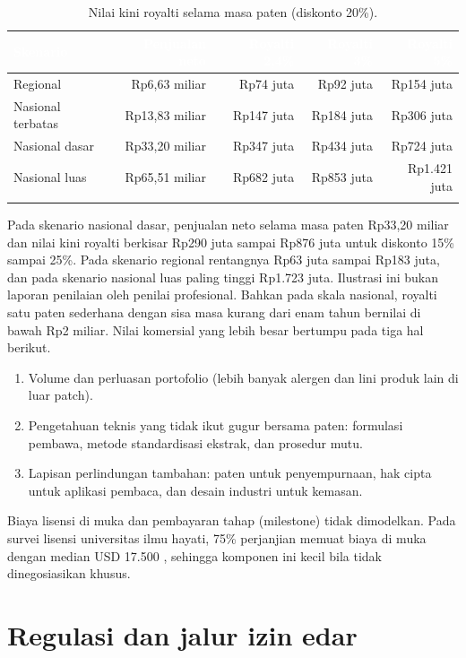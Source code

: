 \documentclass[11pt,a4paper]{article}
\newcommand{\tH}[1]{\textcolor{white}{\sffamily\bfseries\small #1}}
\newcommand{\tabstart}{\small\rowcolors{2}{white}{pale}\arrayrulecolor{rule}}
\newcommand{\hdrrow}{\rowcolor{tealdark}}
\renewcommand{\toprule}{\arrayrulecolor{tealdark}\specialrule{0.9pt}{0pt}{0pt}\arrayrulecolor{rule}}
\renewcommand{\bottomrule}{\arrayrulecolor{tealdark}\specialrule{0.9pt}{0pt}{0pt}\arrayrulecolor{rule}}
\begin{document}
\begin{table}[htbp]
\centering
\caption{Nilai kini royalti selama masa paten (diskonto 20\%).}
\label{tab:ip}
\tabstart
\begin{tabular}{@{}lrrrr@{}}
\toprule
\hdrrow\tH{Skenario} & \tH{Penjualan neto} & \tH{Royalti 2,4\%} & \tH{Royalti 3\%} & \tH{Royalti 5\%} \\
\midrule
Regional & Rp6,63 miliar & Rp74 juta & Rp92 juta & Rp154 juta \\
Nasional terbatas & Rp13,83 miliar & Rp147 juta & Rp184 juta & Rp306 juta \\
Nasional dasar & Rp33,20 miliar & Rp347 juta & Rp434 juta & Rp724 juta \\
Nasional luas & Rp65,51 miliar & Rp682 juta & Rp853 juta & Rp1.421 juta \\
\bottomrule
\end{tabular}
\end{table}

Pada skenario nasional dasar, penjualan neto selama masa paten Rp33,20 miliar dan nilai kini royalti berkisar Rp290 juta sampai Rp876 juta untuk diskonto 15\% sampai 25\%. Pada skenario regional rentangnya Rp63 juta sampai Rp183 juta, dan pada skenario nasional luas paling tinggi Rp1.723 juta. Ilustrasi ini bukan laporan penilaian oleh penilai profesional. Bahkan pada skala nasional, royalti satu paten sederhana dengan sisa masa kurang dari enam tahun bernilai di bawah Rp2 miliar. Nilai komersial yang lebih besar bertumpu pada tiga hal berikut.

\begin{enumerate}
\item Volume dan perluasan portofolio (lebih banyak alergen dan lini produk lain di luar patch).
\item Pengetahuan teknis yang tidak ikut gugur bersama paten: formulasi pembawa, metode standardisasi ekstrak, dan prosedur mutu.
\item Lapisan perlindungan tambahan: paten untuk penyempurnaan, hak cipta untuk aplikasi pembaca, dan desain industri untuk kemasan.
\end{enumerate}

Biaya lisensi di muka dan pembayaran tahap (milestone) tidak dimodelkan. Pada survei lisensi universitas ilmu hayati, 75\% perjanjian memuat biaya di muka dengan median USD 17.500 \cite{gd}, sehingga komponen ini kecil bila tidak dinegosiasikan khusus.

\section{Regulasi dan jalur izin edar}
\end{document}
